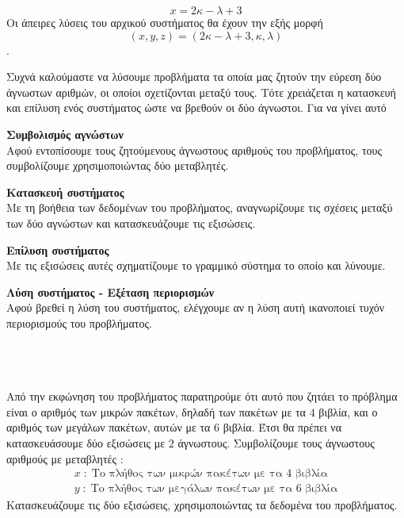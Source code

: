 \[ x=2\kappa-\lambda+3 \]
Οι άπειρες λύσεις του αρχικού συστήματος θα έχουν την εξής μορφή \[ (x,y,z)=(2\kappa-\lambda+3,\kappa,\lambda)\].
\begin{Methodos}{5cm}
Συχνά καλούμαστε να λύσουμε προβλήματα τα οποία μας ζητούν την εύρεση δύο άγνωστων αριθμών, οι οποίοι σχετίζονται μεταξύ τους. Τότε χρειάζεται η κατασκευή και επίλυση ενός συστήματος ώστε να βρεθούν οι δύο άγνωστοι. Για να γίνει αυτό
\begin{bhma}
\item \textbf{Συμβολισμός αγνώστων}\\
Αφού εντοπίσουμε τους ζητούμενους άγνωστους αριθμούς του προβλήματος, τους συμβολίζουμε χρησιμοποιώντας δύο μεταβλητές.
\item \textbf{Κατασκευή συστήματος}\\
Με τη βοήθεια των δεδομένων του προβλήματος, αναγνωρίζουμε τις σχέσεις μεταξύ των δύο αγνώστων και κατασκευάζουμε τις εξισώσεις.
\item \textbf{Επίλυση συστήματος}\\
Με τις εξισώσεις αυτές σχηματίζουμε το γραμμικό σύστημα το οποίο και λύνουμε.
\item \textbf{Λύση συστήματος - Εξέταση περιορισμών}\\
Αφού βρεθεί η λύση του συστήματος, ελέγχουμε αν η λύση αυτή ικανοποιεί τυχόν περιορισμούς του προβλήματος.
\end{bhma}
\end{Methodos}
\\\\
\lysh\\
Από την εκφώνηση του προβλήματος παρατηρούμε ότι αυτό που ζητάει το πρόβλημα είναι ο αριθμός των μικρών πακέτων, δηλαδή των πακέτων με τα $ 4 $ βιβλία, και ο αριθμός των μεγάλων πακέτων, αυτών με τα $ 6 $ βιβλία. Έτσι θα πρέπει να κατασκευάσουμε δύο εξισώσεις με $ 2 $ άγνωστους. Συμβολίζουμε τους άγνωστους αριθμούς με μεταβλητές : \begin{gather*}
x\;:\;\textrm{Το πλήθος των μικρών πακέτων με τα 4 βιβλία}\\
y\;:\;\textrm{Το πλήθος των μεγάλων πακέτων με τα 6 βιβλία}
\end{gather*}
Κατασκευάζουμε τις δύο εξισώσεις, χρησιμοποιώντας τα δεδομένα του προβλήματος.
